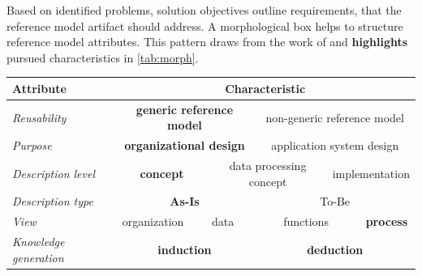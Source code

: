 Based on identified problems, solution objectives outline requirements, that the reference model artifact should address. A morphological box helps to structure reference model attributes. This pattern draws from the work of \cite{Puster2015} and \textbf{highlights} pursued characteristics in \Tab \ref{tab:morph}.  

\begin{table}[caption={Reference model requirements }, label=tab:morph]
	\centering
		\begin{tabular}{ 
				p{3.1cm}  
			p{2cm} p{2cm} p{2cm} p{2cm} p{2cm} p{2cm} p{2cm} p{2cm} p{2cm} p{2cm} p{2cm} p{2cm}    }
			Attribute                                   & \multicolumn{12}{c}{ Characteristic }                                                                                                                  \\ \hline
			\multicolumn{1}{|l|}{\textit{Reusability}}          & \multicolumn{6}{c|}{\textbf{generic reference model}}                       & \multicolumn{6}{c|}{non-generic reference model}                  \\ \hline
			\multicolumn{1}{|l|}{\textit{Purpose}}              & \multicolumn{6}{c|}{\textbf{organizational design}}                         & \multicolumn{6}{c|}{application system design}                    \\ \hline
			\multicolumn{1}{|l|}{\textit{Description level}}    & \multicolumn{4}{c|}{\textbf{concept}}                & \multicolumn{4}{c|}{data processing concept} & \multicolumn{4}{c|}{implementation}       \\ \hline
			\multicolumn{1}{|l|}{\textit{Description type}}     & \multicolumn{6}{c|}{\textbf{As-Is}}                  & \multicolumn{6}{c|}{To-Be}                             \\ \hline
			\multicolumn{1}{|l|}{\textit{View}}                 & \multicolumn{3}{c|}{organization} & \multicolumn{3}{c|}{data}    & \multicolumn{3}{c|}{functions}   & \multicolumn{3}{c|}{\textbf{process}} \\ \hline
			\multicolumn{1}{|l|}{\textit{Knowledge generation}} & \multicolumn{6}{c|}{\textbf{induction}}                                     & \multicolumn{6}{c|}{\textbf{deduction}}                                    \\ \hline 
		
			
	\end{tabular}
\end{table}


